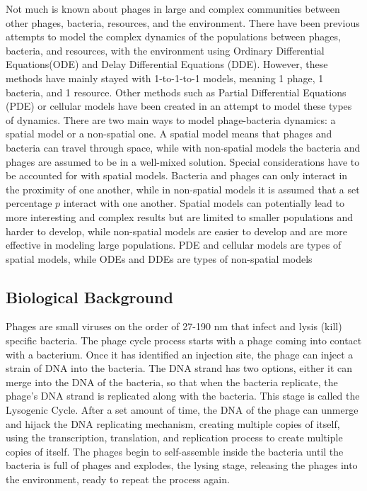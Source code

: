 Not much is known about phages in large and complex communities between other phages, bacteria, resources, and the environment. There have been previous attempts to model the complex dynamics of the populations between phages, bacteria, and resources, with the environment using Ordinary Differential Equations(ODE) and Delay Differential Equations (DDE). However, these methods have mainly stayed with 1-to-1-to-1 models, meaning 1 phage, 1 bacteria, and 1 resource. Other methods such as Partial Differential Equations (PDE) or cellular models have been created in an attempt to model these types of dynamics. There are two main ways to model phage-bacteria dynamics: a spatial model or a non-spatial one. A spatial model means that phages and bacteria can travel through space, while with non-spatial models the bacteria and phages are assumed to be in a well-mixed solution. Special considerations have to be accounted for with spatial models. Bacteria and phages can only interact in the proximity of one another, while in non-spatial models it is assumed that a set percentage $p$ interact with one another. Spatial models can potentially lead to more interesting and complex results but are limited to smaller populations and harder to develop, while non-spatial models are easier to develop and are more effective in modeling large populations. PDE and cellular models are types of spatial models, while ODEs and DDEs are types of non-spatial models \newline 

\subsection{Biological Background}
Phages are small viruses on the order of 27-190 nm that infect and lysis (kill) specific bacteria. The phage cycle process starts with a phage coming into contact with a bacterium. Once it has identified an injection site, the phage can inject a strain of DNA into the bacteria. The DNA strand has two options, either it can merge into the DNA of the bacteria, so that when the bacteria replicate, the phage's DNA strand is replicated along with the bacteria. This stage is called the Lysogenic Cycle. After a set amount of time, the DNA of the phage can unmerge and hijack the DNA replicating mechanism, creating multiple copies of itself, using the transcription, translation, and replication process to create multiple copies of itself. The phages begin to self-assemble inside the bacteria until the bacteria is full of phages and explodes, the lysing stage, releasing the phages into the environment, ready to repeat the process again. 

